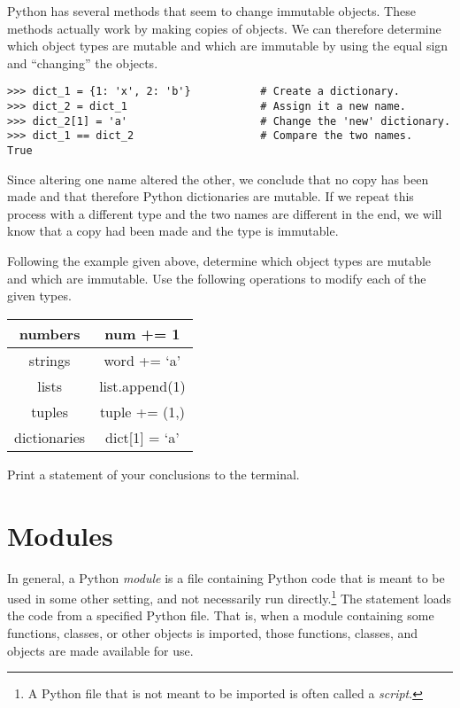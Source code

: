 \begin{problem}
Python has several methods that seem to change immutable objects.
These methods actually work by making copies of objects.
We can therefore determine which object types are mutable and which are immutable by using the equal sign and ``changing'' the objects.

\begin{lstlisting}
>>> dict_1 = {1: 'x', 2: 'b'}           # Create a dictionary.
>>> dict_2 = dict_1                     # Assign it a new name.
>>> dict_2[1] = 'a'                     # Change the 'new' dictionary.
>>> dict_1 == dict_2                    # Compare the two names.
True
\end{lstlisting}

Since altering one name altered the other, we conclude that no copy has been made and that therefore Python dictionaries are mutable.
If we repeat this process with a different type and the two names are different in the end, we will know that a copy had been made and the type is immutable.

Following the example given above, determine which object types are mutable and which are immutable.
Use the following operations to modify each of the given types.

\begin{center}
\begin{tabular}{|c|c|}
\hline
numbers & num += 1 \\
\hline
strings & word += `a' \\
\hline
lists & list.append(1) \\
\hline
tuples & tuple += (1,) \\
\hline
dictionaries & dict[1] = `a' \\
\hline
\end{tabular}
\end{center}
Print a statement of your conclusions to the terminal.
\end{problem}

\section*{Modules}

In general, a Python \emph{module} is a file containing Python code that is meant to be used in some other setting, and not necessarily run directly.\footnote{A Python file that is not meant to be imported is often called a \emph{script}.}
The  statement loads the code from a specified Python file.
That is, when a module containing some functions, classes, or other objects is imported, those functions, classes, and objects are made available for use.

